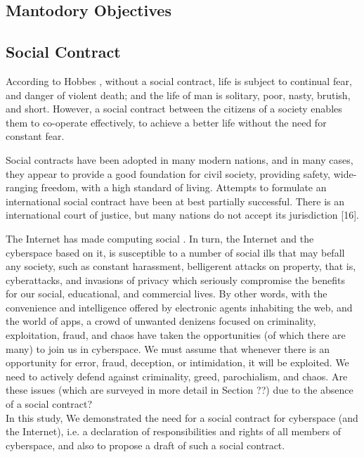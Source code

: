 \subsection{Mantodory Objectives}
\subsection{Social Contract}
According to Hobbes \cite{Leviathan}, without a social contract, life is subject to continual fear, and danger of violent death; and the life of man is solitary, poor, nasty, brutish, and short. 
However, a social contract between the citizens of a society enables them to co-operate effectively, to achieve a better life without the need for constant fear.

Social contracts have been adopted in many modern nations, and in many cases, they appear to provide a good foundation for civil society, providing safety, wide-ranging freedom, with a high standard of living. Attempts to formulate an international social contract have been at best partially successful. There is an international court of justice, but many nations do not accept its jurisdiction [16].

The Internet has made computing social \cite{parameswaran2007social}. In turn, the Internet and the cyberspace based on it, is susceptible to a number of social ills that may befall any society, such as constant harassment, belligerent attacks on property, that is, cyberattacks, and invasions of privacy which seriously compromise the benefits for our social, educational, and commercial lives. By other words, with the convenience and intelligence offered by electronic agents inhabiting the web, and the world of apps, a crowd of unwanted denizens focused on criminality, exploitation, fraud, and chaos have taken the opportunities (of which there are many) to join us in cyberspace.  We must assume that whenever there is an opportunity for error, fraud, deception, or intimidation, it will be exploited. We need to actively defend against criminality, greed, parochialism, and chaos. Are these issues (which are surveyed in more detail in Section ??) due to the absence of a social contract? \\ In this study, We demonstrated the need for a social contract for cyberspace (and the Internet), i.e. a declaration of responsibilities and rights of all members of cyberspace, and also to propose a draft of such a social contract.

